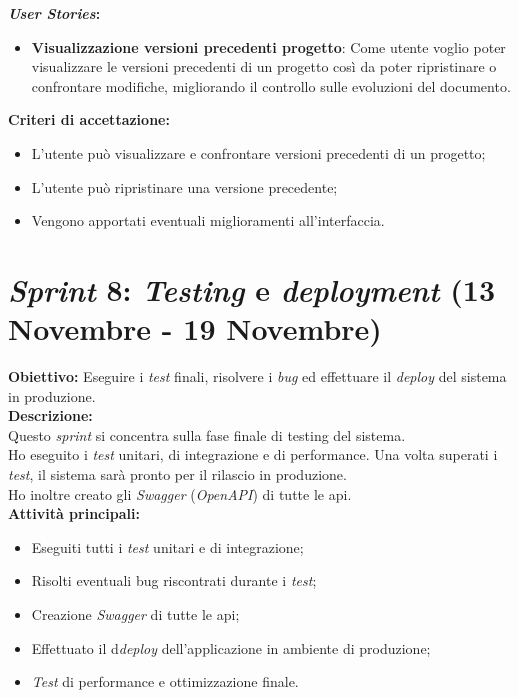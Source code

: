 \noindent \textbf{\textit{User Stories}:} 
\begin{itemize}
    \item \textbf{Visualizzazione versioni precedenti progetto}: Come utente voglio poter visualizzare le versioni precedenti di un progetto così da poter ripristinare o confrontare modifiche, migliorando il controllo sulle evoluzioni del documento.
\end{itemize}

\noindent \textbf{Criteri di accettazione:}  
\begin{itemize}
    \item L'utente può visualizzare e confrontare versioni precedenti di un progetto;
    \item L'utente può ripristinare una versione precedente;
    \item Vengono apportati eventuali miglioramenti all’interfaccia.
\end{itemize}

\section*{\textit{Sprint} 8: \textit{Testing} e \textit{deployment} (13 Novembre - 19 Novembre)}
\textbf{Obiettivo:} Eseguire i \textit{test} finali, risolvere i \textit{bug} ed effettuare il \textit{deploy} del sistema in produzione.\\

\noindent \textbf{Descrizione:}\\
\noindent Questo \textit{sprint} si concentra sulla fase finale di testing del sistema.\\
Ho eseguito i \textit{test} unitari, di integrazione e di performance. Una volta superati i \textit{test}, il sistema sarà pronto per il rilascio in produzione. \\
Ho inoltre creato gli \textit{Swagger} (\textit{OpenAPI}) di tutte le \gls{api}.\\

\noindent \textbf{Attività principali:}
\begin{itemize}
    \item Eseguiti tutti i \textit{test} unitari e di integrazione;
    \item Risolti eventuali bug riscontrati durante i \textit{test};
    \item Creazione \textit{Swagger} di tutte le \gls{api};
    \item Effettuato il d\textit{deploy} dell'applicazione in ambiente di produzione;
    \item \textit{Test} di performance e ottimizzazione finale.
\end{itemize}

